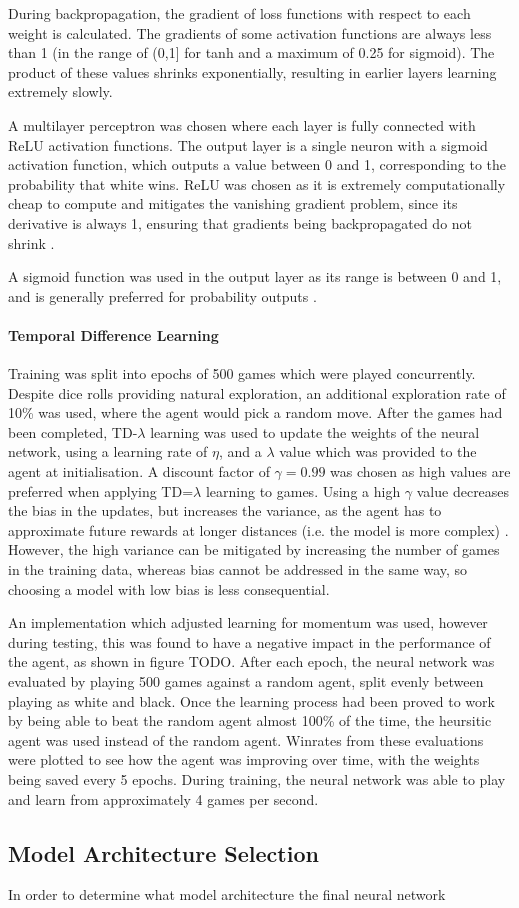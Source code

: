 \begin{definition}
During backpropagation, the gradient of loss functions with respect to each weight is calculated. The gradients of some activation functions are always less than 1 (in the range of (0,1] for tanh and a maximum of 0.25 for sigmoid). The product of these values shrinks exponentially, resulting in earlier layers learning extremely slowly.   
\end{definition}

A multilayer perceptron was chosen where each layer is fully connected with ReLU activation functions. The output layer is a single neuron with a sigmoid activation function, which outputs a value between 0 and 1, corresponding to the probability that white wins. ReLU was chosen as it is extremely computationally cheap to compute and mitigates the vanishing gradient problem, since its derivative is always 1, ensuring that gradients being backpropagated do not shrink \cite{reluvanish}.

A sigmoid function was used in the output layer as its range is between 0 and 1, and is generally preferred for probability outputs \cite{LeCun2012}. 

\paragraph{Temporal Difference Learning}
Training was split into epochs of 500 games which were played concurrently. Despite dice rolls providing natural exploration, an additional exploration rate of 10\% was used, where the agent would pick a random move. 
After the games had been completed, TD-$\lambda$ learning was used to update the weights of the neural network, using a learning rate of $\eta$, and a $\lambda$ value which was provided to the agent at initialisation. A discount factor of $\gamma = 0.99$ was chosen as high values are preferred when applying TD=$\lambda$ learning to games. Using a high $\gamma$ value decreases the bias in the updates, but increases the variance, as the agent has to approximate future rewards at longer distances (i.e. the model is more complex) \cite{BRISCOE20112}. However, the high variance can be mitigated by increasing the number of games in the training data, whereas bias cannot be addressed in the same way, so choosing a model with low bias is less consequential.


An implementation which adjusted learning for momentum was used, however during testing, this was found to have a negative impact in the performance of the agent, as shown in figure TODO.
After each epoch, the neural network was evaluated by playing 500 games against a random agent, split evenly between playing as white and black. 
Once the learning process had been proved to work by being able to beat the random agent almost 100\% of the time, the heursitic agent was used instead of the random agent. Winrates from these evaluations were plotted to see how the agent was improving over time, with the weights being saved every 5 epochs. During training, the neural network was able to play and learn from approximately 4 games per second.

\subsection{Model Architecture Selection}

In order to determine what model architecture the final neural network